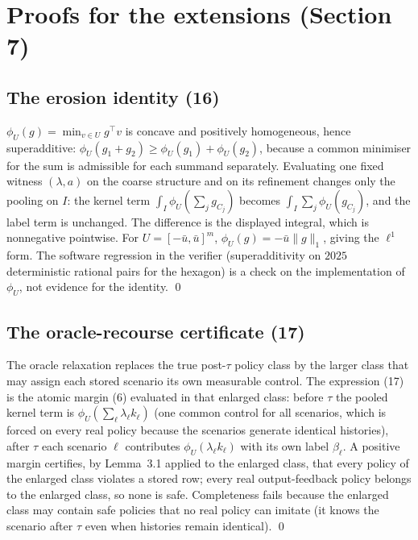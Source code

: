 \section{Proofs for the extensions (Section 7)}\label{S:extensions}

\subsection{The erosion identity (16)}
$\phi_U(g)=\min_{v\in U}g^\top v$ is concave and positively homogeneous, hence superadditive: $\phi_U(g_1+g_2)\ge\phi_U(g_1)+\phi_U(g_2)$, because a common minimiser for the sum is admissible for each summand separately. Evaluating one fixed witness $(\lambda,a)$ on the coarse structure and on its refinement changes only the pooling on $I$: the kernel term $\int_I\phi_U(\sum_jg_{C_j})$ becomes $\int_I\sum_j\phi_U(g_{C_j})$, and the label term is unchanged. The difference is the displayed integral, which is nonnegative pointwise. For $U=[-\bar u,\bar u]^m$, $\phi_U(g)=-\bar u\|g\|_1$, giving the $\ell^1$ form. The software regression in the verifier (superadditivity on $2025$ deterministic rational pairs for the hexagon) is a check on the implementation of $\phi_U$, not evidence for the identity. \qed

\subsection{The oracle-recourse certificate (17)}
The oracle relaxation replaces the true post-$\tau$ policy class by the larger class that may assign each stored scenario its own measurable control. The expression (17) is the atomic margin (6) evaluated in that enlarged class: before $\tau$ the pooled kernel term is $\phi_U(\sum_\ell\lambda_\ell k_\ell)$ (one common control for all scenarios, which is forced on every real policy because the scenarios generate identical histories), after $\tau$ each scenario $\ell$ contributes $\phi_U(\lambda_\ell k_\ell)$ with its own label $\beta_\ell$. A positive margin certifies, by Lemma~3.1 applied to the enlarged class, that every policy of the enlarged class violates a stored row; every real output-feedback policy belongs to the enlarged class, so none is safe. Completeness fails because the enlarged class may contain safe policies that no real policy can imitate (it knows the scenario after $\tau$ even when histories remain identical). \qed

